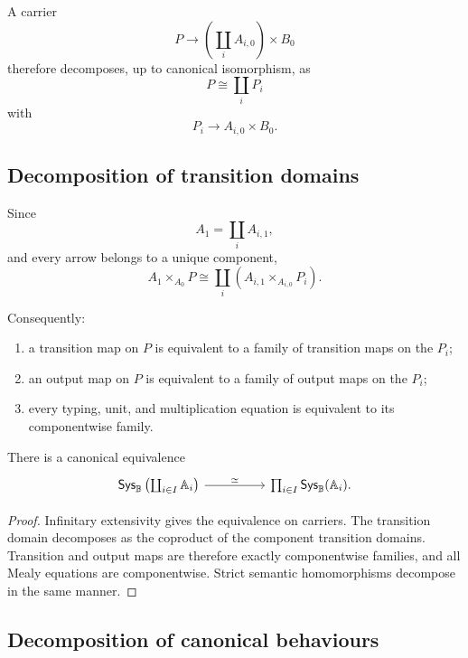 A carrier
\[
    P\to
    \left(
        \coprod_iA_{i,0}
    \right)
    \times B_0
\]
therefore decomposes, up to canonical isomorphism, as
\[
    P\cong\coprod_iP_i
\]
with
\[
    P_i\to A_{i,0}\times B_0.
\]

\subsection{Decomposition of transition domains}
\label{subsec:extensive-decomposition-derivative-domains}

Since
\[
    A_1=\coprod_iA_{i,1},
\]
and every arrow belongs to a unique component,
\[
    A_1\times_{A_0}P
    \cong
    \coprod_i
    \left(
        A_{i,1}\times_{A_{i,0}}P_i
    \right).
\]

Consequently:
\begin{enumerate}
    \item a transition map on \(P\) is equivalent to a family of transition
    maps on the \(P_i\);
    \item an output map on \(P\) is equivalent to a family of output maps on
    the \(P_i\);
    \item every typing, unit, and multiplication equation is equivalent to its
    componentwise family.
\end{enumerate}

\begin{theorem}
\label{thm:extensive-descent-strict-systems}
There is a canonical equivalence
\[
\begin{tikzcd}[column sep=huge]
    \mathsf{Sys}_{\mathbb B}
    \left(
        \coprod_{i\in I}\mathbb A_i
    \right)
        \arrow[r, "\simeq"]
    &
    \prod_{i\in I}
    \mathsf{Sys}_{\mathbb B}(\mathbb A_i).
\end{tikzcd}
\]
\end{theorem}

\begin{proof}
Infinitary extensivity gives the equivalence on carriers. The transition
domain decomposes as the coproduct of the component transition domains.
Transition and output maps are therefore exactly componentwise families, and
all Mealy equations are componentwise. Strict semantic homomorphisms decompose
in the same manner.
\end{proof}

\subsection{Decomposition of canonical behaviours}
\label{subsec:extensive-decomposition-canonical-behaviours}

